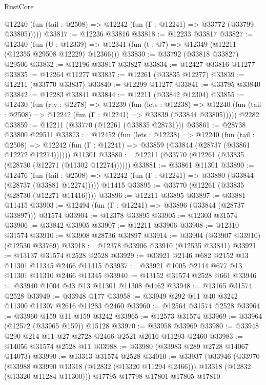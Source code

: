 \begin{lexlean}{RustCore}
\begin{coremodule}
      @12240 (fun (tail : @2508) => @12242 (fun (Γ : @12241) => @33772 (@33799 @33805)))))
@33817 := @12236 @33816
@33818 := @12233 @33817
@33827 := @12340
    (fun (U : @12339) => @12341 (fun (t : @7) => @12349 (@12211 (@12355 @29508 @12229) @12366)))
@33830 := @33792 (@33818 @33827) @29506
@33832 := @12196 @33817 @33827
@33834 := @12427 @33816 @11277
@33835 := @12264 @11277
@33837 := @12261 (@33835 @12277)
@33839 := @12211 (@33770 @33837)
@33840 := @12299 @11277
@33841 := @33795 @33840
@33842 := @12283 @33841
@33844 := @12211 (@33842 @12304)
@33855 := @12430
    (fun (rty : @2278) =>
    @12239
      (fun (lets : @12238) =>
      @12240 (fun (tail : @2508) => @12242 (fun (Γ : @12241) => @33839 (@33844 @33805)))))
    @2282
@33859 := @12211 (@33770 (@12261 (@33835 @28731)))
@33861 := @28738 @33800 @29511
@33873 := @12452
    (fun (lets : @12238) =>
    @12240
      (fun (tail : @2508) =>
      @12242 (fun (Γ : @12241) => @33859 (@33844 (@28737 (@33861 @12272 @12274))))))
    @11301
@33880 := @12211 (@33770 (@12261 (@33835 (@28730 (@12271 (@11302 @12274))))))
@33881 := @33861 @11301
@33890 := @12476
    (fun (tail : @2508) => @12242 (fun (Γ : @12241) => @33880 (@33844 (@28737 (@33881 @12274)))))
    @11415
@33895 := @33770 (@12261 (@33835 (@28730 (@12271 @11416))))
@33896 := @12211 @33895
@33897 := @33881 @11415
@33903 := @12494 (fun (Γ : @12241) => @33896 (@33844 (@28737 @33897))) @31574
@33904 := @12378 @33895
@33905 := @12303 @31574
@33906 := @33842 @33905
@33907 := @12211 @33906
@33908 := @12310 @31574
@33910 := @33908 @28736 @33897
@33914 := @33904 (@33907 @33910) (@12530 @33769)
@33918 := @12378 @33906 @33910 (@12535 @33841)
@33921 := @13137 @31574 @2528 @2528
@33929 := @33921 @2146 @682 @2152 @13 @11301 @11345 @2466 @11415
@33937 := @33921 @1005 @2144 @677 @13 @11301 @11310 @2466 @11345
@33940 := @13152 @31574 @2528 @661
@33946 := @33940 @1004 @43 @13 @11301 @11308 @4462
@33948 := @13165 @31574 @2528
@33949 := @33948 @177
@33958 := @33949 @292 @11 @40 @3242 @11300 @11307 @2616 @11283 @2460
@33960 := @12564 @31574 @2528
@33964 := @33960 @159 @11 @159 @3242
@33965 := @12573 @31574
@33969 := @33964 (@12572 (@33965 @159)) @15128
@33970 := @33958 @33969
@33980 := @33948 @290 @214 @11 @27 @2728 @2466 @2521 @2616 @11293 @2460
@33983 := @14056 @31574 @2528 @11
@33988 := @33980 (@33983 @289 @2728 @14067 @14073)
@33990 := @13313 @31574 @2528
@34010 := @33937
    (@33946
      (@33970
        (@33988 @33990 @13318 (@12832 (@13320 @11294 @2466)))
        @13318
        (@12832 (@13320 @11284 @11300)))
      @17795
      @17798
      @17801
      @17805
      @17810

\end{coremodule}
\end{lexlean}

